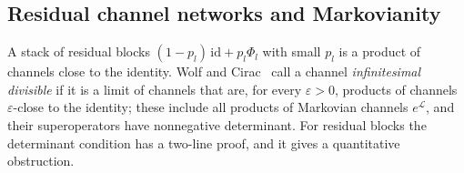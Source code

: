 \providecommand{\RMSteps}{--}\providecommand{\RMRestarts}{--}\providecommand{\RMp}{0.2}\providecommand{\RMDepthMax}{32}
\providecommand{\RMDepths}{1, 2, 4, 8, 16, 32}\providecommand{\RMSeconds}{--}\providecommand{\RMWorkers}{4}
\providecommand{\RMMarkovA}{--}\providecommand{\RMMarkovHS}{--}\providecommand{\RMMarkovTD}{--}
\providecommand{\RMGkslChannel}{--}\providecommand{\RMGkslLindblad}{--}\providecommand{\RMGkslResOne}{--}
\providecommand{\RMGkslResDeep}{--}\providecommand{\RMGkslDet}{--}
\providecommand{\RMDampedChannel}{--}\providecommand{\RMDampedLindblad}{--}\providecommand{\RMDampedResOne}{--}
\providecommand{\RMDampedResDeep}{--}\providecommand{\RMDampedDet}{--}
\providecommand{\RMPauliChannel}{--}\providecommand{\RMPauliLindblad}{--}\providecommand{\RMPauliResOne}{--}
\providecommand{\RMPauliResDeep}{--}\providecommand{\RMPauliDet}{--}
\providecommand{\RMPauliResMin}{--}\providecommand{\RMPauliResMinTD}{--}\providecommand{\RMPauliLindbladTD}{--}
\providecommand{\RMPauliResDetMin}{--}\providecommand{\RMPauliResDetMax}{--}\providecommand{\RMPauliLindbladDet}{--}
\providecommand{\RMPauliChannelDet}{--}\providecommand{\RMDephasedHS}{--}\providecommand{\RMPauliResTDAll}{--}
\providecommand{\RMPauliResTDAllDepth}{--}\providecommand{\RMSemigroupKmax}{--}\providecommand{\RMDampedSemigroupViolation}{--}
\providecommand{\RMRestartSpread}{--}\providecommand{\RMSemigroupBound}{--}
\subsection{Residual channel networks and Markovianity}\label{sec:learn-markov}

A stack of residual blocks $(1-p_l)\,\mathrm{id}+p_l\Phi_l$ with small $p_l$ is a product of channels close to the
identity. Wolf and Cirac~\cite{wolfcirac2008} call a channel \emph{infinitesimal divisible} if it is a limit of
channels that are, for every $\varepsilon>0$, products of channels $\varepsilon$-close to the identity; these
include all products of Markovian channels $e^{\mathcal L}$, and their superoperators have nonnegative determinant.
For residual blocks the determinant condition has a two-line proof, and it gives a quantitative obstruction.

